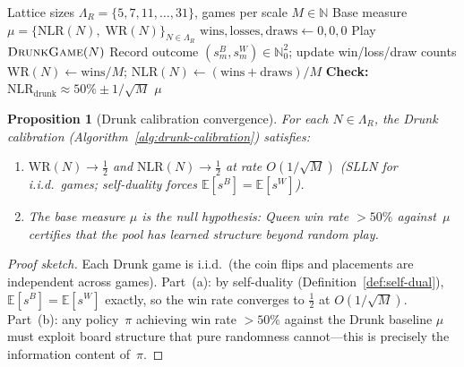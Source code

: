 \documentclass[11pt,a4paper]{article}
\newtheorem{proposition}[theorem]{Proposition}
\begin{document}
\begin{algorithm}[ht]
\caption{Drunk Calibration (Phase~0)
  \textup{[Base Measure Estimation]}}\label{alg:drunk-calibration}
\begin{algorithmic}[1]
\Require Lattice sizes $\Lambda_R = \{5, 7, 11, \ldots, 31\}$,
  games per scale $M \in \mathbb{N}$
\Ensure Base measure
  $\mu = \{\mathrm{NLR}(N),\; \mathrm{WR}(N)\}_{N \in \Lambda_R}$
  \State $\text{wins}, \text{losses}, \text{draws} \gets 0, 0, 0$
    \State Play $\textsc{DrunkGame}(N)$
    \State Record outcome $(s^B_m, s^W_m) \in \mathbb{N}_0^2$;\;
      update win/loss/draw counts
  \EndFor
  \State $\mathrm{WR}(N) \gets \text{wins} / M$;\quad
    $\mathrm{NLR}(N) \gets (\text{wins} + \text{draws}) / M$
  \State \textbf{Check:}
    $\mathrm{NLR}_{\mathrm{drunk}}
    \approx 50\% \pm 1/\sqrt{M}$
\EndFor
\State \Return $\mu$
\end{algorithmic}
\end{algorithm}

\begin{proposition}[Drunk calibration convergence]%
\label{prop:drunk-convergence}
For each $N \in \Lambda_R$, the Drunk calibration
(Algorithm~\ref{alg:drunk-calibration}) satisfies:
\begin{enumerate}[label=(\alph*),nosep]
\item $\mathrm{WR}(N) \to \tfrac{1}{2}$ and
  $\mathrm{NLR}(N) \to \tfrac{1}{2}$
  at rate $O(1/\sqrt{M})$
  (SLLN for i.i.d.\ games; self-duality forces
  $\mathbb{E}[s^B] = \mathbb{E}[s^W]$).
\item The base measure $\mu$ is the null hypothesis:
  Queen win rate $> 50\%$ against~$\mu$ certifies
  that the pool has learned structure beyond random play.
\end{enumerate}
\end{proposition}

\begin{proof}[Proof sketch]
Each Drunk game is i.i.d.\ (the coin flips and placements
are independent across games).
Part~(a): by self-duality
(Definition~\ref{def:self-dual}),
$\mathbb{E}[s^B] = \mathbb{E}[s^W]$ exactly, so the
win rate converges to $\tfrac{1}{2}$ at $O(1/\sqrt{M})$.
Part~(b): any policy~$\pi$ achieving win rate $> 50\%$
against the Drunk baseline $\mu$ must exploit
board structure that pure randomness cannot---this
is precisely the information content of~$\pi$.
\end{proof}
\end{document}
